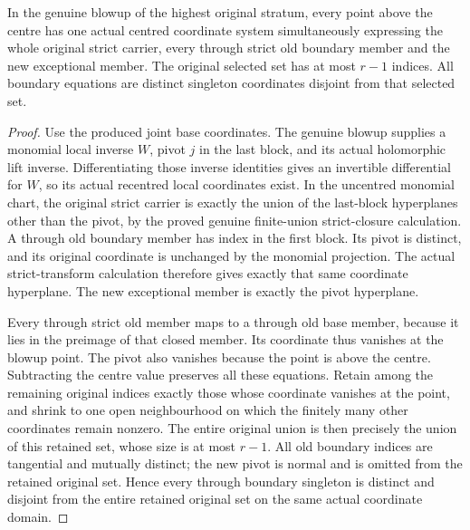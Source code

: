 \begin{lemma}
\label{hir:general-nc-joint-boundary-coordinates-over-centre}
\leanok
In the genuine blowup of the highest original stratum, every point
above the centre has one actual centred coordinate system simultaneously
expressing the whole original strict carrier, every through strict
old boundary member and the new exceptional member. The original
selected set has at most $r-1$ indices. All boundary equations are
distinct singleton coordinates disjoint from that selected set.
\end{lemma}
\begin{proof}
Use the produced joint base coordinates. The genuine blowup supplies
a monomial local inverse $W$, pivot $j$ in the last block, and its
actual holomorphic lift inverse. Differentiating those inverse
identities gives an invertible differential for $W$, so its actual
recentred local coordinates exist. In the uncentred monomial chart,
the original strict carrier is exactly the union of the last-block
hyperplanes other than the pivot, by the proved genuine finite-union
strict-closure calculation. A through old boundary member has index
in the first block. Its pivot is distinct, and its original coordinate
is unchanged by the monomial projection. The actual strict-transform
calculation therefore gives exactly that same coordinate hyperplane.
The new exceptional member is exactly the pivot hyperplane.

Every through strict old member maps to a through old base member,
because it lies in the preimage of that closed member. Its coordinate
thus vanishes at the blowup point. The pivot also vanishes because
the point is above the centre. Subtracting the centre value preserves
all these equations. Retain among the remaining original indices
exactly those whose coordinate vanishes at the point, and shrink to
one open neighbourhood on which the finitely many other coordinates
remain nonzero. The entire original union is then precisely the union
of this retained set, whose size is at most $r-1$. All old boundary
indices are tangential and mutually distinct; the new pivot is normal
and is omitted from the retained original set. Hence every through
boundary singleton is distinct and disjoint from the entire retained
original set on the same actual coordinate domain.
\end{proof}


